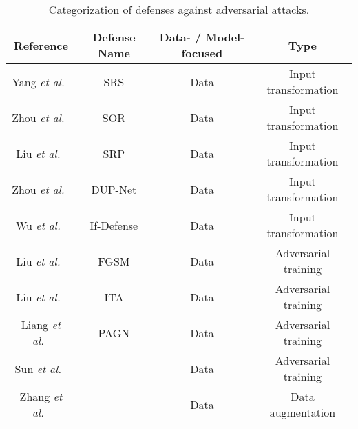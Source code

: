 \documentclass{ieeeaccess}
\def\etal{\textit{et al.}}
\begin{document}
\begin{table*}
\centering
\caption{Categorization of defenses against adversarial attacks.}
\label{table:Categories_defenses}       %
\begin{tabular}{c c | c c}
\toprule

\bf Reference &  \bf Defense Name & \bf Data- / Model-focused & \bf Type   \\
   


\midrule

\multirow{1}{*}{Yang \etal~\cite{yang2019adversarial}} & SRS & Data & Input transformation \\ 
\hline

\multirow{1}{*}{Zhou \etal~\cite{zhou2019dup}} & SOR & Data & Input transformation \\ 
\hline

\multirow{1}{*}{Liu \etal~\cite{liu2019extending}} & SRP & Data & Input transformation \\ 
\hline

\multirow{1}{*}{Zhou \etal~\cite{zhou2019dup}} & DUP-Net & Data & Input transformation \\ 
\hline

\multirow{1}{*}{Wu \etal~\cite{wu2020if}} & If-Defense & Data & Input transformation \\ 
\hline

\multirow{1}{*}{Liu \etal~\cite{liu2019extending}} & FGSM & Data & Adversarial training \\ 
\hline

\multirow{1}{*}{Liu \etal~\cite{liu2022imperceptible}} & ITA & Data & Adversarial training \\ 
\hline

\multirow{1}{*}{Liang \etal~\cite{liang2022pagn}} & PAGN & Data & Adversarial training \\ 
\hline

\multirow{1}{*}{Sun \etal~\cite{sun2021adversarially}} & --- & Data & Adversarial training \\ 
\hline

\multirow{1}{*}{Zhang \etal~\cite{zhang2022comprehensive}} & --- & Data & Data augmentation \\ 
\hline


\end{tabular}
\end{table*}
\end{document}
